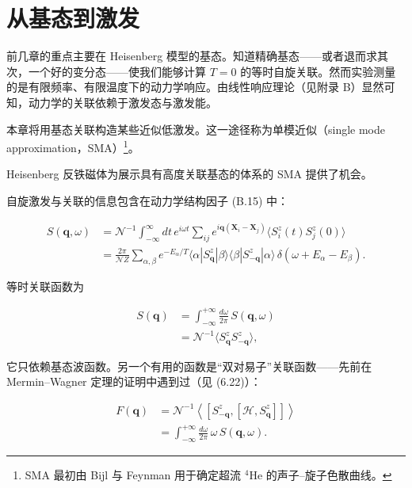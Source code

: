 \chapter{从基态到激发}

前几章的重点主要在 Heisenberg 模型的基态。知道精确基态——或者退而求其次，一个好的变分态——使我们能够计算 $T = 0$ 的等时自旋关联。然而实验测量的是有限频率、有限温度下的动力学响应。由线性响应理论（见附录 B）显然可知，动力学的关联依赖于激发态与激发能。

本章将用基态关联构造某些近似低激发。这一途径称为单模近似（single mode approximation，SMA）\footnote{SMA 最初由 Bijl 与 Feynman 用于确定超流 ${}^{4}$He 的声子--旋子色散曲线。}。

Heisenberg 反铁磁体为展示具有高度关联基态的体系的 SMA 提供了机会。

自旋激发与关联的信息包含在动力学结构因子 (B.15) 中：

\begin{align*}
S ( \mathbf {q}, \omega ) & = \mathcal {N} ^ {- 1} \int_ {- \infty} ^ {\infty} d t \, e ^ {i \omega t} \sum_ {ij} e ^ {i \mathbf {q} ( \mathbf {X} _ {i} - \mathbf {X} _ {j} )} \langle S _ {i} ^ {z} ( t ) S _ {j} ^ {z} ( 0 ) \rangle\\
& = \frac {2 \pi}{\mathcal {N} Z} \sum_ {\alpha , \beta} e ^ {- E _ {\alpha} / T} \langle \alpha | S _ {\mathbf {q}} ^ {z} | \beta \rangle \langle \beta | S _ {- \mathbf {q}} ^ {z} | \alpha \rangle \, \delta ( \omega + E _ {\alpha} - E _ {\beta} ) .
\tag{9.1}
\end{align*}

等时关联函数为

\begin{align*}
S ( \mathbf {q} ) & = \int_ {- \infty} ^ {+ \infty} \frac {d \omega}{2 \pi} \, S ( \mathbf {q}, \omega )\\
& = \mathcal {N} ^ {- 1} \langle S _ {\mathbf {q}} ^ {z} S _ {- \mathbf {q}} ^ {z} \rangle ,
\tag{9.2}
\end{align*}

它只依赖基态波函数。另一个有用的函数是“双对易子”关联函数——先前在 Mermin--Wagner 定理的证明中遇到过（见 (6.22)）：

\begin{align*}
F ( \mathbf {q} ) & = \mathcal {N} ^ {- 1} \left\langle \left[ S _ {- \mathbf {q}} ^ {z}, [ \mathcal {H}, S _ {\mathbf {q}} ^ {z} ] \right] \right\rangle\\
& = \int_ {- \infty} ^ {+ \infty} \frac {d \omega}{2 \pi} \, \omega \, S ( \mathbf {q}, \omega ).
\tag{9.3}
\end{align*}

